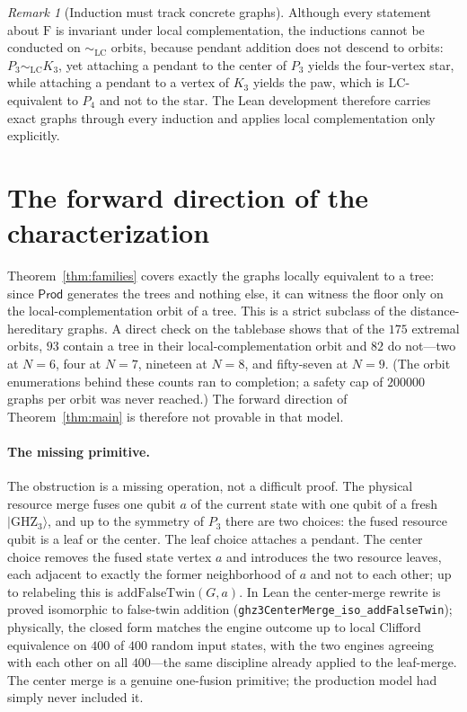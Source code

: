 \documentclass[11pt]{article}
\theoremstyle{definition}
\theoremstyle{remark}
\newtheorem{remark}[theorem]{Remark}
\newcommand{\F}{\mathrm{F}}
\newcommand{\GHZ}{\mathrm{GHZ}_3}
\newcommand{\LC}{\mathrm{LC}}
\newcommand{\Prod}{\mathsf{Prod}}
\newcommand{\N}{N}
\newcommand{\code}[1]{\texttt{#1}}
\begin{document}
\begin{remark}[Induction must track concrete graphs]\label{rem:naive}
Although every statement about $\F$ is invariant under local complementation, the inductions cannot
be conducted on $\sim_{\LC}$ orbits, because pendant addition does not descend to orbits:
$P_3\sim_{\LC}K_3$, yet attaching a pendant to the center of $P_3$ yields the four-vertex star,
while attaching a pendant to a vertex of $K_3$ yields the paw, which is LC-equivalent to $P_4$ and
not to the star. The Lean development therefore carries exact graphs through every induction and
applies local complementation only explicitly.
\end{remark}

\section{The forward direction of the characterization}\label{sec:forward}

Theorem~\ref{thm:families} covers exactly the graphs locally equivalent to a tree: since $\Prod$
generates the trees and nothing else, it can witness the floor only on the local-complementation
orbit of a tree. This is a strict subclass of the distance-hereditary graphs. A direct check on
the tablebase shows that of the $175$ extremal orbits, $93$ contain a tree in their
local-complementation orbit and $82$ do not---two at $\N=6$, four at $\N=7$, nineteen at $\N=8$,
and fifty-seven at $\N=9$. (The orbit enumerations behind these counts ran to completion; a safety
cap of $200000$ graphs per orbit was never reached.) The forward direction of
Theorem~\ref{thm:main} is therefore not provable in that model.

\paragraph{The missing primitive.} The obstruction is a missing operation, not a difficult proof.
The physical resource merge fuses one qubit $a$ of the current state with one qubit of a fresh
$|\GHZ\rangle$, and up to the symmetry of $P_3$ there are two choices: the fused resource qubit is
a leaf or the center. The leaf choice attaches a pendant. The center choice removes the fused
state vertex $a$ and introduces the two resource leaves, each adjacent to exactly the former
neighborhood of $a$ and not to each other; up to relabeling this is $\mathrm{addFalseTwin}(G,a)$.
In Lean the center-merge rewrite is proved isomorphic to false-twin addition
(\code{ghz3CenterMerge\_iso\_addFalseTwin}); physically, the closed form matches the engine
outcome up to local Clifford equivalence on $400$ of $400$ random input states, with the two
engines agreeing with each other on all $400$---the same discipline already applied to the
leaf-merge. The center merge is a genuine one-fusion primitive; the production model had simply
never included it.
\end{document}
